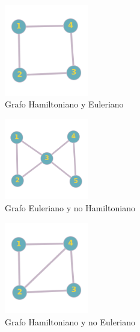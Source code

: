\documentclass[a4paper,1pt]{report}
\begin{document}
\begin{figure}[H]
    \centering
    \begin{subfigure}[b]{0.45\textwidth}
    \centering
    \includegraphics[width=0.4\textwidth]{figures4/C4.png}
    \caption{Grafo Hamiltoniano y Euleriano}
    \end{subfigure}
    \begin{subfigure}[b]{0.45\textwidth}
        \centering
    \includegraphics[width=0.4\textwidth]{figures4/noHsiE.png}
    \caption{Grafo Euleriano y no Hamiltoniano}
    \end{subfigure}
    \begin{subfigure}[b]{0.45\textwidth}
        \centering
    \includegraphics[width=0.4\textwidth]{figures4/SiHnoE.png}
    \caption{Grafo Hamiltoniano y no Euleriano}
    \end{subfigure}
    \begin{subfigure}[b]{0.45\textwidth}

\end{subfigure}
\end{figure}
\end{document}
